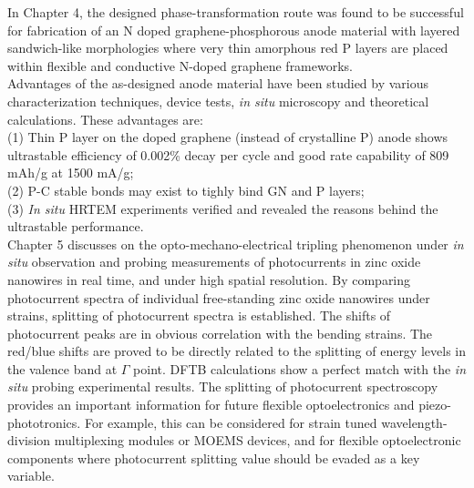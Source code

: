In Chapter 4, the designed phase-transformation route was found to be successful for fabrication of an N doped graphene-phosphorous anode material with layered sandwich-like morphologies where very thin amorphous red P layers are placed within flexible and conductive N-doped graphene frameworks.\\
Advantages of the as-designed anode material have been studied by various characterization techniques, device tests, {\it in situ} microscopy and theoretical calculations. 
These advantages are: \\
(1) Thin P layer on the doped graphene (instead of crystalline P) anode shows ultrastable efficiency of 0.002\% decay per cycle and good rate capability of 809 mAh/g at 1500 mA/g; \\
(2) P-C stable bonds may exist to tighly bind GN and P layers; \\
(3) {\it In situ} HRTEM experiments verified and revealed the reasons behind the ultrastable performance.\\

Chapter 5 discusses on the opto-mechano-electrical tripling phenomenon under {\it in situ} observation and probing measurements of photocurrents in zinc oxide nanowires in real time, and under high spatial resolution. 
By comparing photocurrent spectra of individual free-standing zinc oxide nanowires under strains, splitting of photocurrent spectra is established. 
The shifts of photocurrent peaks are in obvious correlation with the bending strains. 
The red/blue shifts are proved to be directly related to the splitting of energy levels in the valence band at $\Gamma$ point. 
DFTB calculations show a perfect match with the {\it in situ} probing experimental results. 
The splitting of photocurrent spectroscopy provides an important information for future flexible optoelectronics and piezo-phototronics. 
For example, this can be considered for strain tuned wavelength-division multiplexing modules or MOEMS devices, and for flexible optoelectronic components where photocurrent splitting value should be evaded as a key variable. \\


